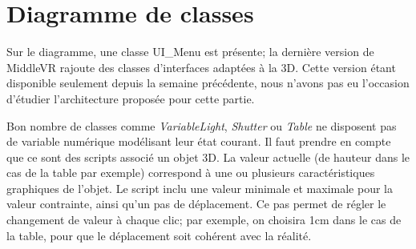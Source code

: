 \section{Diagramme de classes}

Sur le diagramme, une classe UI_Menu est présente; la dernière version de MiddleVR rajoute des classes d'interfaces adaptées à la 3D.
Cette version étant disponible seulement depuis la semaine précédente, nous n'avons pas eu l'occasion d'étudier l'architecture proposée pour cette partie.

Bon nombre de classes comme \textit{VariableLight}, \textit{Shutter} ou \textit{Table} ne disposent pas de variable numérique modélisant leur état courant.
Il faut prendre en compte que ce sont des scripts associé un objet 3D. La valeur actuelle (de hauteur dans le cas de la table par exemple) correspond à une ou plusieurs caractéristiques graphiques de l'objet.
Le script inclu une valeur minimale et maximale pour la valeur contrainte, ainsi qu'un pas de déplacement.
Ce pas permet de régler le changement de valeur à chaque clic; par exemple, on choisira 1cm dans le cas de la table, pour que le déplacement soit cohérent avec la réalité.
 
 
 